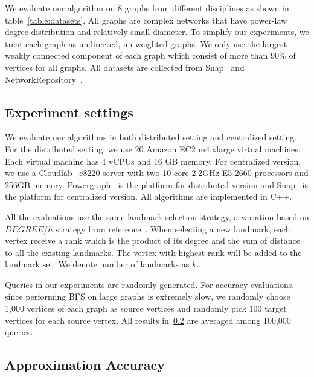 We evaluate our algorithm on 8 graphs from different disciplines as shown in table~\ref{table:datasets}. All graphs are complex networks that have power-law degree distribution and relatively small diameter. To simplify our experiments, we treat each graph as undirected, un-weighted graphs. We only use the largest weakly connected component of each graph which consist of more than $90\%$ of vertices for all graphs. All datasets are collected from Snap~\cite{snapnets} and NetworkRepository~\cite{nr}.

\subsection{Experiment settings}
\label{eval_system}

We evaluate our algorithms in both distributed setting and centralized setting. For the distributed setting, we use 20 Amazon EC2 m4.xlarge virtual machines. Each virtual machine has 4 vCPUs and 16 GB memory. For centralized version, we use a Cloudlab~\cite{RicciEide:login14} c8220 server with two 10-core 2.2GHz E5-2660 processors and 256GB memory. Powergraph~\cite{180251} is the platform for distributed version and Snap~\cite{snapnets} is the platform for centralized version. All algorithms are implemented in C++. 

All the evaluations use the same landmark selection strategy, a variation based on $DEGREE/h$ strategy from reference~\cite{Potamias:2009:FSP:1645953.1646063}. When selecting a new landmark, each vertex receive a rank which is the product of its degree and the sum of distance to all the existing landmarks. The vertex with highest rank will be added to the landmark set. We denote number of landmarks as $k$.

Queries in our experiments are randomly generated. For accuracy evaluations, since performing BFS on large graphs is extremely slow, we randomly choose 1,000 vertices of each graph as source vertices and randomly pick 100 target vertices for each source vertex. All results in~\ref{eval_accuracy} are averaged among 100,000 queries.

\subsection{Approximation Accuracy}
\label{eval_accuracy}

